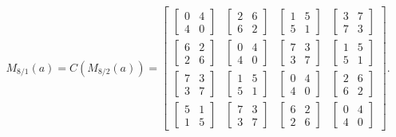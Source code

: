 \[
	M_{8/1}(a) = C(M_{8/2}(a)) =
	\begin{bmatrix}
		\begin{bmatrix} 0 & 4 \\ 4 & 0 \end{bmatrix} & \begin{bmatrix} 2 & 6 \\ 6 & 2 \end{bmatrix} & \begin{bmatrix} 1 & 5 \\ 5 & 1 \end{bmatrix} & \begin{bmatrix} 3 & 7 \\ 7 & 3 \end{bmatrix} \\[1em]
		\begin{bmatrix} 6 & 2 \\ 2 & 6 \end{bmatrix} & \begin{bmatrix} 0 & 4 \\ 4 & 0 \end{bmatrix} & \begin{bmatrix} 7 & 3 \\ 3 & 7 \end{bmatrix} & \begin{bmatrix} 1 & 5 \\ 5 & 1 \end{bmatrix} \\[1em]
		\begin{bmatrix} 7 & 3 \\ 3 & 7 \end{bmatrix} & \begin{bmatrix} 1 & 5 \\ 5 & 1 \end{bmatrix} & \begin{bmatrix} 0 & 4 \\ 4 & 0 \end{bmatrix} & \begin{bmatrix} 2 & 6 \\ 6 & 2 \end{bmatrix} \\[1em]
		\begin{bmatrix} 5 & 1 \\ 1 & 5 \end{bmatrix} & \begin{bmatrix} 7 & 3 \\ 3 & 7 \end{bmatrix} & \begin{bmatrix} 6 & 2 \\ 2 & 6 \end{bmatrix} & \begin{bmatrix} 0 & 4 \\ 4 & 0 \end{bmatrix}
	\end{bmatrix}.
\]

